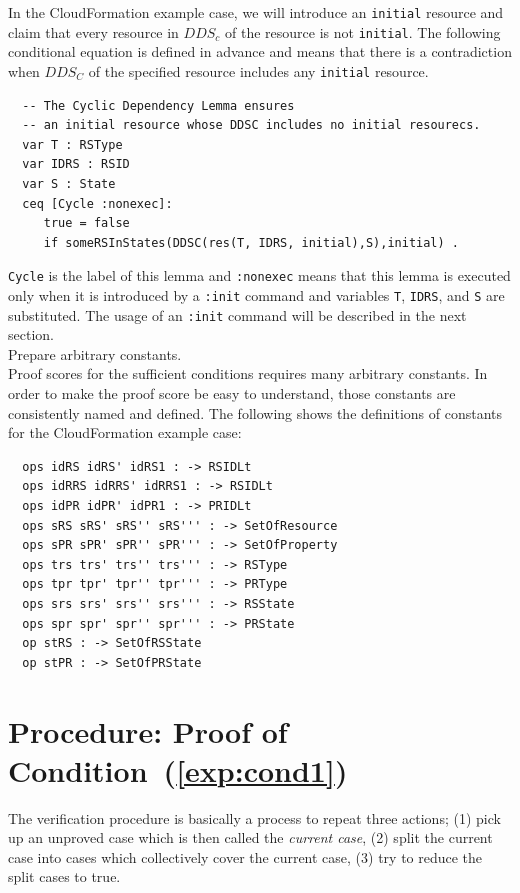 \documentclass[12pt]{report}
\begin{document}
In the CloudFormation example case, we will introduce an {\tt initial}
resource and claim that every resource in $\mathit{DDS_c}$ of the resource is
not {\tt initial}. The following conditional equation is defined in
advance and means that there is a contradiction when $\mathit{DDS_C}$ of the
specified resource includes any {\tt initial} resource.
\small
\begin{verbatim}
  -- The Cyclic Dependency Lemma ensures
  -- an initial resource whose DDSC includes no initial resourecs.
  var T : RSType
  var IDRS : RSID
  var S : State
  ceq [Cycle :nonexec]: 
     true = false
     if someRSInStates(DDSC(res(T, IDRS, initial),S),initial) .
\end{verbatim}
\normalsize
{\tt Cycle} is the label of this lemma and {\tt :nonexec} means that
this lemma is executed only when it is introduced by a {\tt :init}
command and variables {\tt T}, {\tt IDRS}, and {\tt S} are
substituted. The usage of an {\tt :init} command will be described in
the next section.\\

 Prepare arbitrary constants. \\
Proof scores for the sufficient conditions requires many arbitrary constants.
In order to make the proof score be easy to understand, those constants
are consistently named and defined. The following shows the definitions
of constants for the CloudFormation example case:
\small
\begin{verbatim}
  ops idRS idRS' idRS1 : -> RSIDLt
  ops idRRS idRRS' idRRS1 : -> RSIDLt
  ops idPR idPR' idPR1 : -> PRIDLt
  ops sRS sRS' sRS'' sRS''' : -> SetOfResource
  ops sPR sPR' sPR'' sPR''' : -> SetOfProperty
  ops trs trs' trs'' trs''' : -> RSType
  ops tpr tpr' tpr'' tpr''' : -> PRType
  ops srs srs' srs'' srs''' : -> RSState
  ops spr spr' spr'' spr''' : -> PRState
  op stRS : -> SetOfRSState
  op stPR : -> SetOfPRState
\end{verbatim}
\normalsize
\section{Procedure: Proof of Condition~(\ref{exp:cond1})}
\label{sec:initcont}
The verification procedure is basically a process to repeat three
actions; (1) pick up an unproved case which is then called the
{\it current case}, (2) split the current case into cases which
collectively cover the current case, (3) try to reduce the split cases
to true.\\
\end{document}

